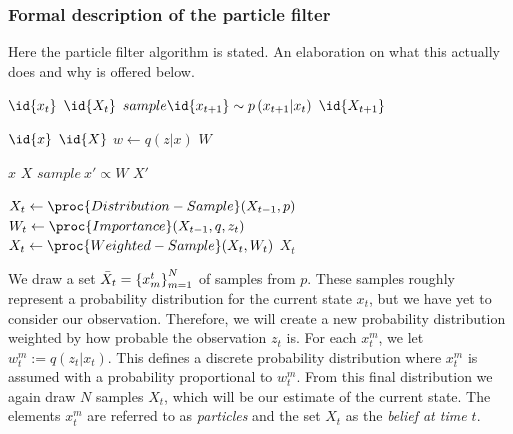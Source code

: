 \subsubsection{Formal description of the particle filter}
Here the particle filter algorithm is stated. An elaboration on what this actually does and why is offered below.

\begin{codebox}
\li \ForEach $\id{x_t}$ \In $\id{X_t}$
\li     \Do
            $sample \id{x_{t+1}} \sim p\left(x_{t+1}|x_t\right)$
        \End
\li \Return $\id{X_{t+1}}$
\end{codebox}
\begin{codebox}
\li \ForEach $\id{x}$ \In $\id{X}$ 
\li     \Do
            $w \gets q\left(z|x\right)$
        \End
\li \Return $W$
\end{codebox}
\begin{codebox}
\li \ForEach $x$ \In $X$
\li     \Do
            $sample ~ x' \propto W$   
        \End
\li \Return $X'$
\end{codebox}
\begin{codebox}
\li $X_t \gets \proc{Distribution-Sample}(X_{t-1},p)$
\li $W_t \gets \proc{Importance}(X_{t-1},q,z_t)$
\li $X_t \gets \proc{Weighted-Sample}(X_t,W_t)$
\li \Return $X_t$
\end{codebox}



We draw a set $\bar{X}_t = \left\{x_{m}^{t}\right\}_{m=1}^{N}$ of samples from $p$. These samples roughly represent a probability distribution for the current state $x_t$, but we have yet to consider our observation. Therefore, we will create a new probability distribution weighted by how probable the observation $z_t$ is. For each $x_t^m$, we let $w_t^m := q\left(z_t | x_t\right)$. This defines a discrete probability distribution where $x_t^m$ is assumed with a probability proportional to $w_t^m$. From this final distribution we again draw $N$ samples $X_t$, which will be our estimate of the current state. The elements $x_t^m$ are referred to as \emph{particles} and the set $X_t$ as the \emph{belief at time $t$}.


